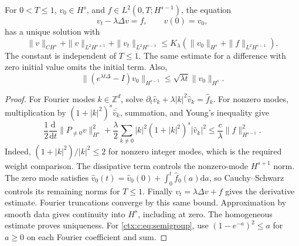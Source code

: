 For $0<T\leq1$, $v_0\in H^s$, and $f\in L^2(0,T;H^{s-1})$, the equation
\begin{equation}
 v_t-\lambda\Delta v=f,\qquad v(0)=v_0,
\end{equation}
has a unique solution with
\begin{equation}
 \|v\|_{CH^s}+\|v\|_{L^2H^{s+1}}+\|v_t\|_{L^2H^{s-1}}
 \leq K_\lambda\left(\|v_0\|_{H^s}+\|f\|_{L^2H^{s-1}}\right).
 \label{ctx:c:eq:heatestimate}
\end{equation}
The constant is independent of $T\leq1$. The same estimate for a difference with zero initial value omits the initial term. Also,
\begin{equation}
 \|(e^{\lambda t\Delta}-I)v_0\|_{H^{s-1}}
 \leq\sqrt{\lambda t}\|v_0\|_{H^s}.
 \label{ctx:c:eq:semigroup}
\end{equation}

\begin{proof}
For Fourier modes $k\in\mathbb Z^d$, solve
$\partial_t\widehat v_k+\lambda|k|^2\widehat v_k=\widehat f_k$.
For nonzero modes, multiplication by $(1+|k|^2)^s\overline{\widehat v_k}$, summation, and Young's inequality give
\begin{equation}
 \frac12\frac{\mathrm d}{\mathrm d t}\|P_{\ne0}v\|_{H^s}^2
 +\frac\lambda2\sum_{k\ne0}|k|^2(1+|k|^2)^s|\widehat v_k|^2
 \leq\frac c\lambda\|f\|_{H^{s-1}}^2.
 \label{ctx:c:eq:fourierenergy}
\end{equation}
Indeed, $(1+|k|^2)/|k|^2\leq2$ for nonzero integer modes, which is the required weight comparison. The dissipative term controls the nonzero-mode $H^{s+1}$ norm. The zero mode satisfies
$\widehat v_0(t)=\widehat v_0(0)+\int_0^t\widehat f_0(a)\mathrm d a$,
so Cauchy--Schwarz controls its remaining norms for $T\leq1$. Finally $v_t=\lambda\Delta v+f$ gives the derivative estimate. Fourier truncations converge by this same bound. Approximation by smooth data gives continuity into $H^s$, including at zero. The homogeneous estimate proves uniqueness. For \cref{ctx:c:eq:semigroup}, use $(1-e^{-a})^2\leq a$ for $a\geq0$ on each Fourier coefficient and sum.
\end{proof}

